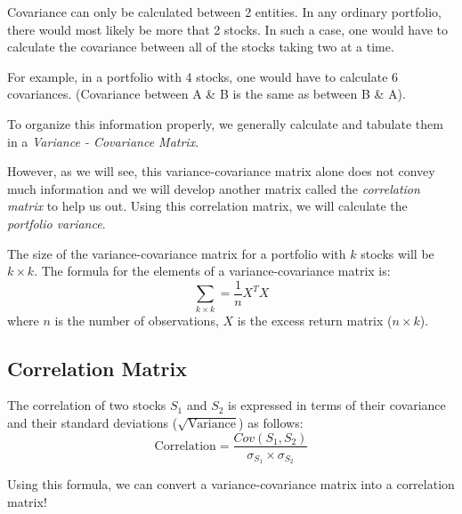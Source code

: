 Covariance can only be calculated between 2 entities. In any ordinary portfolio, there would most likely be more that 2 stocks. In such a case, one would have to calculate the covariance between all of the stocks taking two at a time.

For example, in a portfolio with 4 stocks, one would have to calculate 6 covariances. (Covariance between A \& B is the same as between B \& A).

To organize this information properly, we generally calculate and tabulate them in a \emph{Variance - Covariance Matrix}.

However, as we will see, this variance-covariance matrix alone does not convey much information and we will develop another matrix called the \emph{correlation matrix} to help us out. Using this correlation matrix, we will calculate the \emph{portfolio variance}.

The size of the variance-covariance matrix for a portfolio with $k$ stocks will be $k \times k$. The formula for the elements of a variance-covariance matrix is:
\[
  \sum_{k \times k} = \frac{1}{n} X^T X
\]
where $n$ is the number of observations, $X$ is the excess return matrix ($n \times k$).




\subsection{Correlation Matrix}

The correlation of two stocks $S_1$ and $S_2$ is expressed in terms of their covariance and their standard deviations ($\sqrt{\textrm{Variance}}$) as follows:
\[
  \textrm{Correlation} = \frac{Cov(S_1, S_2)}{\sigma_{S_1} \times \sigma_{S_2}}
\]

Using this formula, we can convert a variance-covariance matrix into a correlation matrix!

